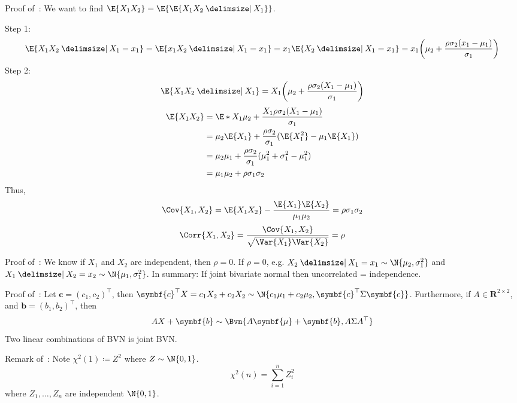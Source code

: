 \begin{Proof}{}{}
    Proof of~: We want to find $ \E{X_1X_2}=\E{\E{X_1X_2\given X_1}} $.

    Step 1:
    \[ \E{X_1X_2\given X_1=x_1}=\E{x_1X_2\given X_1=x_1}=
        x_1\E{X_2\given X_1=x_1}=x_1
        \biggl(  \mu_2+\frac{\rho\sigma_2(x_1-\mu_1)}{\sigma_1} \biggr) \]
    Step 2:
    \[ \E{X_1X_2\given X_1}=X_1
        \biggl(  \mu_2+\frac{\rho\sigma_2(X_1-\mu_1)}{\sigma_1} \biggr)
    \]
    \begin{align*}
        \E{X_1X_2}
         & = \E*{X_1\mu_2+\frac{X_1\rho\sigma_2(X_1-\mu_1)}{\sigma_1}}            \\
         & =\mu_2\E{X_1}+\frac{\rho\sigma_2}{\sigma_1}
        (\E{X_1^2}-\mu_1\E{X_1})                                                  \\
         & =\mu_2\mu_1+\frac{\rho\sigma_2}{\sigma_1}( \mu_1^2+\sigma_1^2-\mu_1^2) \\
         & =\mu_1\mu_2+\rho\sigma_1\sigma_2
    \end{align*}
    Thus,
    \[ \Cov{X_1,X_2}=\E{X_1X_2}-\frac{\E{X_1}\E{X_2}}{\mu_1\mu_2}=\rho\sigma_1\sigma_2  \]
    \[ \Corr{X_1,X_2}=\frac{\Cov{X_1,X_2}}{\sqrt{\Var{X_1}\Var{X_2}}}=\rho  \]

    Proof of~: We know if $ X_1 $ and $ X_2 $ are independent, then $ \rho=0 $.
    If $ \rho=0 $, e.g. $ X_2\given X_1=x_1 \sim \N{\mu_2,\sigma_1^2} $
    and $ X_1\given X_2=x_2 \sim \N{\mu_1,\sigma_1^2} $.
    In summary: If joint bivariate normal then uncorrelated = independence.

    Proof of~: Let $ \symbf{c}=(c_1,c_2)^\top $, then
    $ \symbf{c}^\top X=c_1X_2+c_2X_2 \sim \N{c_1\mu_1+c_2\mu_2,\symbf{c}^\top \Sigma\symbf{c}} $.
    Furthermore, if $ A\in\mathbf{R}^{2\times 2} $, and
    $ \symbf{b}=(b_1,b_2)^\top $, then
    \[ AX+\symbf{b} \sim \Bvn{A\symbf{\mu}+\symbf{b},A\Sigma A^\top} \]
    Two linear combinations of BVN is joint BVN.\
\end{Proof}
\begin{Remark}{}{}
    Remark of~: Note $ \chi^2(1)\coloneq Z^2 $ where $ Z \sim \N{0,1} $.
    \[ \chi^2(n)=
        \sum_{i=1}^{n} Z_i^2 \]
    where $ Z_1,\ldots,Z_n $ are independent $ \N{0,1} $.
\end{Remark}

